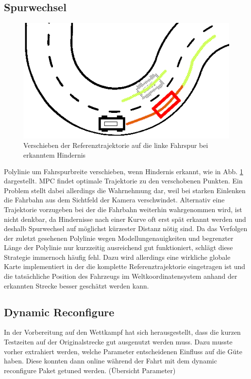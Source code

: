 \subsection{Spurwechsel}
\begin{figure} 
\centering
\includegraphics[scale=0.55]{Bilder/Spurwechsel.png}
\caption{Verschieben der Referenztrajektorie auf die linke Fahrspur bei erkanntem Hindernis}
\label{fig:spurwechsel}
\end{figure}
Polylinie um Fahrspurbreite verschieben, wenn Hindernis erkannt, wie in Abb. \ref{fig:spurwechsel} dargestellt. MPC findet optimale Trajektorie zu den verschobenen Punkten. Ein Problem stellt dabei allerdings die Wahrnehmung dar, weil bei starken Einlenken die Fahrbahn aus dem Sichtfeld der Kamera verschwindet. Alternativ eine Trajektorie vorzugeben bei der die Fahrbahn weiterhin wahrgenommen wird, ist nicht denkbar, da Hindernisse nach einer Kurve oft erst spät erkannt werden und deshalb Spurwechsel auf möglichst kürzester Distanz nötig sind. Da das Verfolgen der zuletzt gesehenen Polylinie wegen Modellungenauigkeiten und begrenzter Länge der Polylinie nur kurzzeitig ausreichend gut funktioniert, schlägt diese Strategie immernoch häufig fehl. Dazu wird allerdings eine wirkliche globale Karte implementiert in der die komplette Referenztrajektorie eingetragen ist und die tatsächliche Position des Fahrzeugs im Weltkoordinatensystem anhand der erkannten Strecke besser geschätzt werden kann.

\subsection{Dynamic Reconfigure}
In der Vorbereitung auf den Wettkampf hat sich herausgestellt, dass die kurzen Testzeiten auf der Originalstrecke gut ausgenutzt werden muss. Dazu musste vorher extrahiert werden, welche Parameter entscheidenen Einfluss auf die Güte haben. Diese konnten dann online während der Fahrt mit dem dynamic reconfigure Paket getuned werden. (Übersicht Parameter)\\
